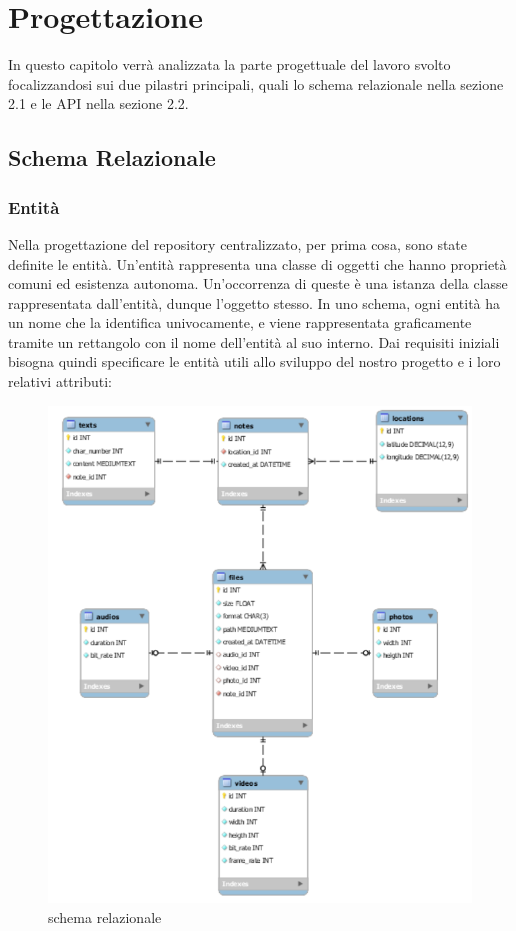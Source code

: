 \chapter{Progettazione}

In questo capitolo verrà analizzata la parte progettuale del lavoro svolto focalizzandosi sui due pilastri principali, quali lo schema relazionale nella sezione 2.1 e le API nella sezione 2.2.

\section{Schema Relazionale}
\subsection{Entità}
Nella progettazione del repository centralizzato, per prima cosa, sono state definite le entità. Un'entità rappresenta una classe di oggetti che hanno proprietà comuni ed esistenza autonoma. Un'occorrenza di queste è una istanza della classe rappresentata dall'entità, dunque l'oggetto stesso. In uno schema, ogni entità ha un nome che la identifica univocamente, e viene rappresentata graficamente tramite un rettangolo con il nome dell'entità al suo interno.
Dai requisiti iniziali bisogna quindi specificare le entità utili allo sviluppo del nostro progetto e i loro relativi attributi:

\begin{figure}[!h]
	\centering
	\includegraphics{schemaER.png}
	\caption{schema relazionale}
\end{figure}

